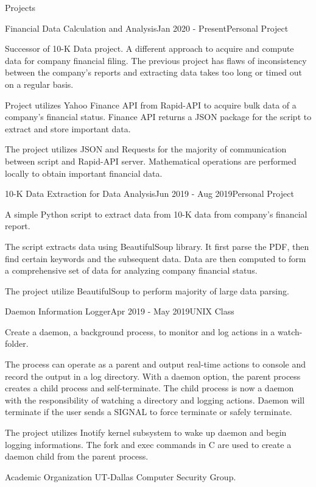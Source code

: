 \documentclass{resume} %
\begin{document}
\begin{rSection}{Projects}
    \begin{rSubsection}{Financial Data Calculation and Analysis}{Jan 2020 - Present}{Personal Project}{}
        \item Successor of 10-K Data project. A different approach to acquire and compute data for company financial filing. The previous project has flaws of inconsistency between the company's reports and extracting data takes too long or timed out on a regular basis.
        \item Project utilizes Yahoo Finance API from Rapid-API to acquire bulk data of a company's financial status. Finance API returns a JSON package for the script to extract and store important data.
        \item The project utilizes JSON and Requests for the majority of communication between script and Rapid-API server. Mathematical operations are performed locally to obtain important financial data.
    \end{rSubsection}
    
    \begin{rSubsection}{10-K Data Extraction for Data Analysis}{Jun 2019 - Aug 2019}{Personal Project}{}
        \item A simple Python script to extract data from 10-K data from company's financial report.
        \item The script extracts data using BeautifulSoup library. It first parse the PDF, then find certain keywords and the subsequent data. Data are then computed to form a comprehensive set of data for analyzing company financial status.
        \item The project utilize BeautifulSoup to perform majority of large data parsing.
    \end{rSubsection}
    
    \begin{rSubsection}{Daemon Information Logger}{Apr 2019 - May 2019}{UNIX Class}{}
        \item Create a daemon, a background process, to monitor and log actions in a watch-folder.
        \item The process can operate as a parent and output real-time actions to console and record the output in a log directory. With a daemon option, the parent process creates a child process and self-terminate. The child process is now a daemon with the responsibility of watching a directory and logging actions. Daemon will terminate if the user sends a SIGNAL to force terminate or safely terminate. 
        \item The project utilizes Inotify kernel subsystem to wake up daemon and begin logging informations. The fork and exec commands in C are used to create a daemon child from the parent process.
    \end{rSubsection}
\end{rSection}


\begin{rSection}{Academic Organization} 
    UT-Dallas Computer Security Group.
\end{rSection}
\end{document}
